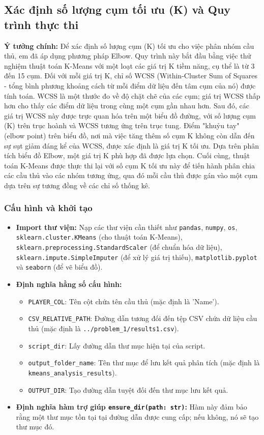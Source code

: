 \documentclass[12pt, a4paper]{report}
\begin{document}
\subsection{Xác định số lượng cụm tối ưu (K) và Quy trình thực thi}
\textbf{Ý tưởng chính:} Để xác định số lượng cụm (K) tối ưu cho việc phân nhóm cầu thủ, em đã áp dụng phương pháp Elbow.
Quy trình này bắt đầu bằng việc thử nghiệm thuật toán K-Means với một loạt các giá trị K tiềm năng, cụ thể là từ 3 đến 15 cụm.
Đối với mỗi giá trị K, chỉ số WCSS (Within-Cluster Sum of Squares - tổng bình phương khoảng cách từ mỗi điểm dữ liệu đến tâm cụm của nó) được tính toán.
WCSS là một thước đo về độ chặt chẽ của các cụm; giá trị WCSS thấp hơn cho thấy các điểm dữ liệu trong cùng một cụm gần nhau hơn.
Sau đó, các giá trị WCSS này được trực quan hóa trên một biểu đồ đường, với số lượng cụm (K) trên trục hoành và WCSS tương ứng trên trục tung.
Điểm "khuỷu tay" (elbow point) trên biểu đồ, nơi mà việc tăng thêm số cụm K không còn dẫn đến sự sụt giảm đáng kể của WCSS, được xác định là giá trị K tối ưu.
Dựa trên phân tích biểu đồ Elbow, một giá trị K phù hợp đã được lựa chọn.
Cuối cùng, thuật toán K-Means được thực thi lại với số cụm K tối ưu này để tiến hành phân chia các cầu thủ vào các nhóm tương ứng, qua đó mỗi cầu thủ được gán vào một cụm dựa trên sự tương đồng về các chỉ số thống kê.

\subsubsection*{Cấu hình và khởi tạo}
\begin{itemize}
    \item \textbf{Import thư viện:} Nạp các thư viện cần thiết như \texttt{pandas}, \texttt{numpy}, \texttt{os}, \texttt{sklearn.cluster.KMeans} (cho thuật toán K-Means), \texttt{sklearn.preprocessing.StandardScaler} (để chuẩn hóa dữ liệu), \texttt{sklearn.impute.SimpleImputer} (để xử lý giá trị thiếu), \texttt{matplotlib.pyplot} và \texttt{seaborn} (để vẽ biểu đồ).
    \item \textbf{Định nghĩa hằng số cấu hình:}
    \begin{itemize}
        \item \texttt{PLAYER\_COL}: Tên cột chứa tên cầu thủ (mặc định là 'Name').
        \item \texttt{CSV\_RELATIVE\_PATH}: Đường dẫn tương đối đến tệp CSV chứa dữ liệu cầu thủ (mặc định là \texttt{../problem\_1/results1.csv}).
        \item \texttt{script\_dir}: Lấy đường dẫn thư mục hiện tại của script.
        \item \texttt{output\_folder\_name}: Tên thư mục để lưu kết quả phân tích (mặc định là \texttt{kmeans\_analysis\_results}).
        \item \texttt{OUTPUT\_DIR}: Tạo đường dẫn tuyệt đối đến thư mục lưu kết quả.
    \end{itemize}
    \item \textbf{Định nghĩa hàm trợ giúp \texttt{ensure\_dir(path: str)}:} Hàm này đảm bảo rằng một thư mục tồn tại tại đường dẫn được cung cấp; nếu không, nó sẽ tạo thư mục đó.
\end{itemize}
\end{document}
